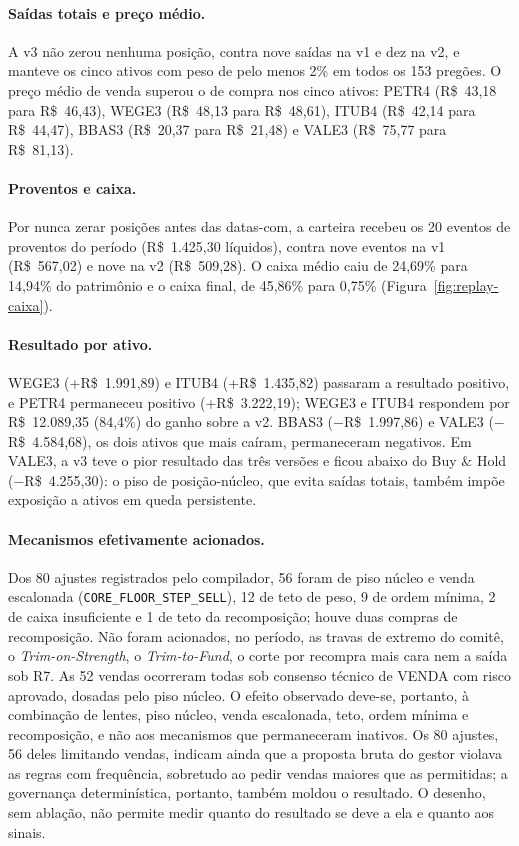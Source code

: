 \paragraph*{Saídas totais e preço médio.} A v3 não zerou nenhuma posição, contra nove saídas na v1 e dez na v2, e manteve os cinco ativos com peso de pelo menos 2\% em todos os 153 pregões. O preço médio de venda superou o de compra nos cinco ativos: PETR4 (R\$~43,18 para R\$~46,43), WEGE3 (R\$~48,13 para R\$~48,61), ITUB4 (R\$~42,14 para R\$~44,47), BBAS3 (R\$~20,37 para R\$~21,48) e VALE3 (R\$~75,77 para R\$~81,13).

\paragraph*{Proventos e caixa.} Por nunca zerar posições antes das datas-com, a carteira recebeu os 20 eventos de proventos do período (R\$~1.425,30 líquidos), contra nove eventos na v1 (R\$~567,02) e nove na v2 (R\$~509,28). O caixa médio caiu de 24,69\% para 14,94\% do patrimônio e o caixa final, de 45,86\% para 0,75\% (Figura~\ref{fig:replay-caixa}).

\paragraph*{Resultado por ativo.} WEGE3 (+R\$~1.991,89) e ITUB4 (+R\$~1.435,82) passaram a resultado positivo, e PETR4 permaneceu positivo (+R\$~3.222,19); WEGE3 e ITUB4 respondem por R\$~12.089,35 (84,4\%) do ganho sobre a v2. BBAS3 ($-$R\$~1.997,86) e VALE3 ($-$R\$~4.584,68), os dois ativos que mais caíram, permaneceram negativos. Em VALE3, a v3 teve o pior resultado das três versões e ficou abaixo do Buy \& Hold ($-$R\$~4.255,30): o piso de posição-núcleo, que evita saídas totais, também impõe exposição a ativos em queda persistente.

\paragraph*{Mecanismos efetivamente acionados.} Dos 80 ajustes registrados pelo compilador, 56 foram de piso núcleo e venda escalonada (\texttt{CORE\_FLOOR\_STEP\_SELL}), 12 de teto de peso, 9 de ordem mínima, 2 de caixa insuficiente e 1 de teto da recomposição; houve duas compras de recomposição. Não foram acionados, no período, as travas de extremo do comitê, o \textit{Trim-on-Strength}, o \textit{Trim-to-Fund}, o corte por recompra mais cara nem a saída sob R7. As 52 vendas ocorreram todas sob consenso técnico de VENDA com risco aprovado, dosadas pelo piso núcleo. O efeito observado deve-se, portanto, à combinação de lentes, piso núcleo, venda escalonada, teto, ordem mínima e recomposição, e não aos mecanismos que permaneceram inativos. Os 80 ajustes, 56 deles limitando vendas, indicam ainda que a proposta bruta do gestor violava as regras com frequência, sobretudo ao pedir vendas maiores que as permitidas; a governança determinística, portanto, também moldou o resultado. O desenho, sem ablação, não permite medir quanto do resultado se deve a ela e quanto aos sinais.

